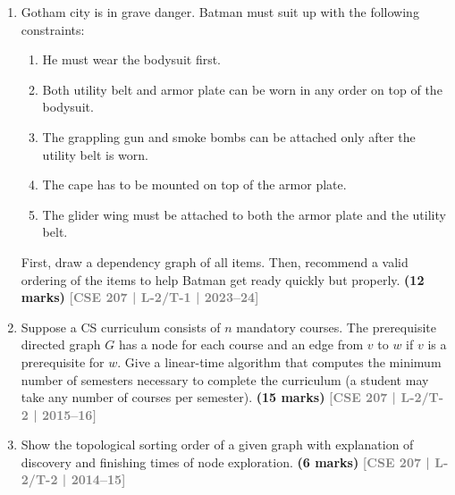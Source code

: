 \documentclass[12pt]{article}
\newcommand{\yr}[1]{\hfill\textcolor{gray}{\small\textbf{[#1]}}}
\newcommand{\mk}[1]{\textcolor{orange!70!black}{\small\textbf{(#1 marks)}}}
\begin{document}
\begin{enumerate}

  \item Gotham city is in grave danger. Batman must suit up with the following constraints:
    \begin{enumerate}
      \item  He must wear the bodysuit first.
      \item  Both utility belt and armor plate can be worn in any order on top of the bodysuit.
      \item  The grappling gun and smoke bombs can be attached only after the utility belt is worn.
      \item  The cape has to be mounted on top of the armor plate.
      \item  The glider wing must be attached to both the armor plate and the utility belt.
    \end{enumerate}
    First, draw a dependency graph of all items. Then, recommend a valid ordering of the items to help Batman get ready quickly but properly.
    \mk{12} \yr{CSE 207 | L-2/T-1 | 2023--24}


  \item Suppose a CS curriculum consists of $n$ mandatory courses. The prerequisite directed graph $G$ has a node for each course and an edge from $v$ to $w$ if $v$ is a prerequisite for $w$. Give a linear-time algorithm that computes the minimum number of semesters necessary to complete the curriculum (a student may take any number of courses per semester). \mk{15}
    \yr{CSE 207 | L-2/T-2 | 2015--16}


  \item Show the topological sorting order of a given graph with explanation of discovery and finishing times of node exploration. \mk{6}
    \yr{CSE 207 | L-2/T-2 | 2014--15}

    \begin{center}
    \end{center}


\end{enumerate}
\end{document}

